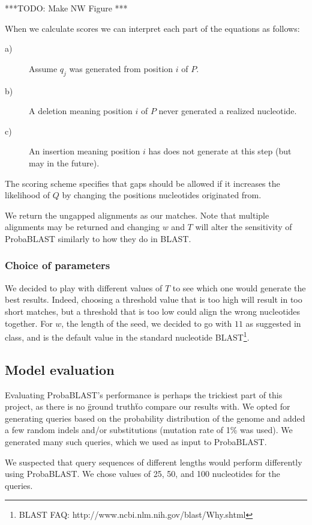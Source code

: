 \documentclass[12pt]{IEEEtran}
\begin{document}
***TODO: Make NW Figure ***

When we calculate scores we can interpret each part of the equations as follows:

\begin{description}
  \item[a)] Assume $q_j$ was generated from position $i$ of $P$.
  \item[b)] A deletion meaning position $i$ of $P$ never generated a realized nucleotide.
  \item[c)] An insertion meaning position $i$ has does not generate at this step (but may in the future).
\end{description}

The scoring scheme specifies that gaps should be allowed if it increases the likelihood of $Q$ by changing the positions nucleotides originated from.


We return the ungapped alignments as our matches. Note that multiple alignments may be returned and changing $w$ and $T$ will alter the sensitivity of ProbaBLAST similarly to how they do in BLAST.


\subsubsection{Choice of parameters}

We decided to play with different values of $T$ to see which one would generate the best results. Indeed, choosing a threshold value that is too high will result in too short matches, but a threshold that is too low could align the wrong nucleotides together.
For $w$, the length of the seed, we decided to go with $11$ as suggested in class, and is the default value in the standard nucleotide BLAST\footnote{BLAST FAQ: http://www.ncbi.nlm.nih.gov/blast/Why.shtml}.

\subsection{Model evaluation}

Evaluating ProbaBLAST's performance is perhaps the trickiest part of this project, as there is no \"ground truth\" to compare our results with. We opted for generating queries based on the probability distribution of the genome and added a few random indels and/or substitutions (mutation rate of 1\% was used). We generated many such queries, which we used as input to ProbaBLAST.

We suspected that query sequences of different lengths would perform differently using ProbaBLAST. We chose values of 25, 50, and 100 nucleotides for the queries. 
\end{document}
